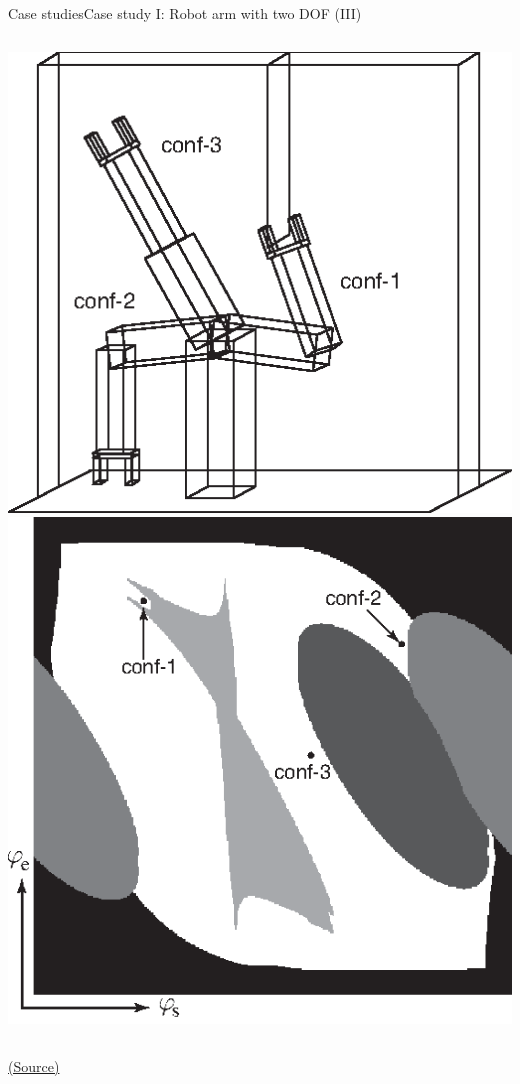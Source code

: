 \documentclass[10pt,compress]{beamer} %
\begin{document}
\begin{frame}{Case studies}{Case study I: Robot arm with two DOF (III)}
       \begin{columns}
	            \centering \includegraphics[width=\linewidth]{figs/armExampleWorkSpace.eps}\\
	            \centering \includegraphics[width=\linewidth]{figs/armExampleConfSpace.eps}\\
      \end{columns}
	  \centering \tiny{\href{http://aima.cs.berkeley.edu/index.html}{(Source)}}
\end{frame}
\end{document}

